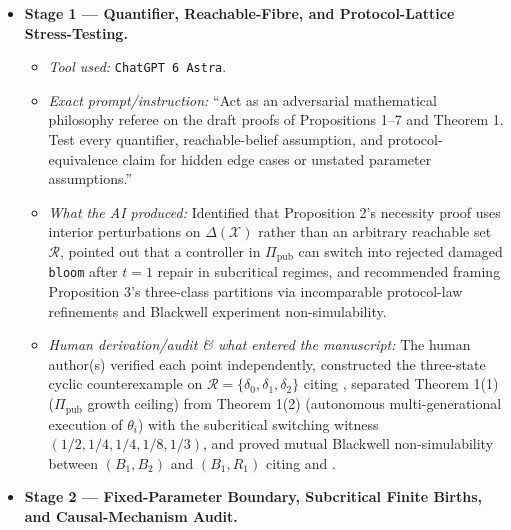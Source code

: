 \documentclass[12pt,letterpaper]{article}
\providecommand{\tightlist}{\setlength{\itemsep}{2pt}\setlength{\parskip}{0pt}}
\begin{document}
\begin{enumerate}
  \begin{itemize}
  \tightlist
  \item
    \textbf{Stage 1 --- Quantifier, Reachable-Fibre, and
    Protocol-Lattice Stress-Testing.}

    \begin{itemize}
    \tightlist
    \item
      \emph{Tool used:} \texttt{ChatGPT\ 6\ Astra}.
    \item
      \emph{Exact prompt/instruction:} ``Act as an adversarial
      mathematical philosophy referee on the draft proofs of
      Propositions 1--7 and Theorem 1. Test every quantifier,
      reachable-belief assumption, and protocol-equivalence claim for
      hidden edge cases or unstated parameter assumptions.''
    \item
      \emph{What the AI produced:} Identified that Proposition 2's
      necessity proof uses interior perturbations on
      \(\Delta(\mathcal{X})\) rather than an arbitrary reachable set
      \(\mathcal{R}\), pointed out that a controller in
      \(\Pi_{\mathrm{pub}}\) can switch into rejected damaged
      \texttt{bloom} after \(t=1\) repair in subcritical regimes, and
      recommended framing Proposition 3's three-class partitions via
      incomparable protocol-law refinements and Blackwell experiment
      non-simulability.
    \item
      \emph{Human derivation/audit \& what entered the manuscript:} The
      human author(s) verified each point independently, constructed the
      three-state cyclic counterexample on
      \(\mathcal{R}=\{\delta_0,\delta_1,\delta_2\}\) citing
      \citet{poupartBoutilier2003}, separated Theorem 1(1)
      (\(\Pi_{\mathrm{pub}}\) growth ceiling) from Theorem 1(2)
      (autonomous multi-generational execution of \(\theta_i\)) with the
      subcritical switching witness \((1/2,1/4,1/4,1/8,1/3)\), and
      proved mutual Blackwell non-simulability between \((B_1,B_2)\) and
      \((B_1,R_1)\) citing \citet{blackwell1953} and
      \citet{barnettCrutchfield2015}.
    \end{itemize}
  \item
    \textbf{Stage 2 --- Fixed-Parameter Boundary, Subcritical Finite
    Births, and Causal-Mechanism Audit.}


\end{itemize}
\end{enumerate}
\end{document}
